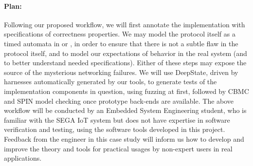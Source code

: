 \paragraph{Plan:}

Following our proposed workflow, we will first annotate the implementation with specifications of correctness properties.  We may model the protocol itself as a timed automata in \uppaal or \prism, in order to ensure that there is not a subtle flaw in the protocol itself, and to model our expectations of behavior in the real system (and to better understand needed specifications).
Either of these steps may expose the source of the mysterious networking failures.
We will use DeepState, driven by harnesses automatically generated by our tools, to generate tests of the implementation components in question, using fuzzing at first, followed by CBMC and SPIN model checking once prototype back-ends are available.
%
%
The above workflow will be conducted by an Embedded System Engineering student, who is familiar with the SEGA IoT system but does not have expertise in software verification and testing, using the software tools developed in this project.
Feedback from the engineer in this case study will inform us how to develop and improve the theory and tools for practical usages by non-expert users in real applications.


